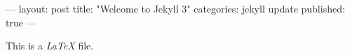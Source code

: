 ---
layout: post
title:  "Welcome to Jekyll 3"
categories: jekyll update
published: true
---


This is a \emph{LaTeX} file.